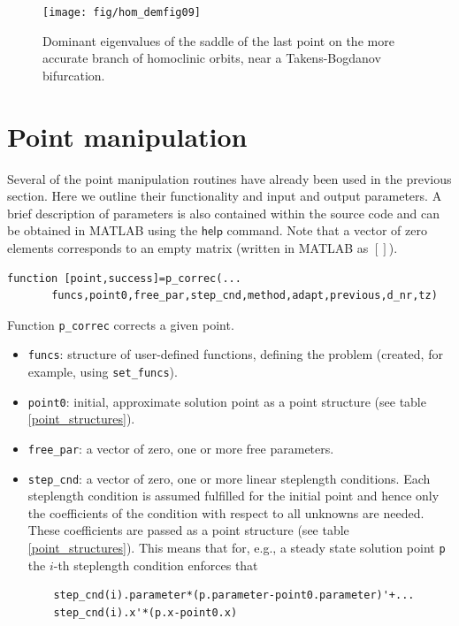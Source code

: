 \documentclass[10pt]{scrartcl}
\newcommand{\parm}[1]{\mathsf{#1}}
\newcommand{\blist}[1]{\mbox{\lstinline!#1!}}
\begin{document}
{\begin{figure}
  \begin{center}
    \texttt{[image: fig/hom\_demfig09]}
    \caption{Dominant eigenvalues of the saddle of the last point on the 
      more accurate branch
      of homoclinic orbits,
      near a Takens-Bogdanov bifurcation.\label{demo3-9}}
  \end{center}
\end{figure}

\fi
\section{Point manipulation}\label{point_manipulation}

Several of the point manipulation routines have already been used in
the previous section.  Here we outline their functionality and input
and output parameters.  A brief description of parameters is also
contained within the source code and can be obtained in MATLAB using
the $\parm{help}$ command. Note that a vector of zero elements
corresponds to an empty matrix (written in MATLAB as $[]$). 
\begin{lstlisting}
function [point,success]=p_correc(...
       funcs,point0,free_par,step_cnd,method,adapt,previous,d_nr,tz)  
\end{lstlisting}
\noindent Function \blist{p_correc} corrects a given point.
\begin{itemize}
\item \blist{funcs}: structure of user-defined functions, defining the
  problem (created, for example, using \blist{set_funcs}).
\item \blist{point0}: initial, approximate solution point as a point
  structure (see table \ref{point_structures}).
\item \blist{free_par}: a vector of zero, one or more free parameters.
\item \blist{step_cnd}: a vector of zero, one or more linear
  steplength conditions. Each steplength condition is assumed
  fulfilled for the initial point and hence only the coefficients of
  the condition with respect to all unknowns are needed. These
  coefficients are passed as a point structure (see table
  \ref{point_structures}).  This means that for, e.g., a steady state
  solution point \blist{p} the $i$-th steplength condition enforces that
  \begin{lstlisting}
    step_cnd(i).parameter*(p.parameter-point0.parameter)'+...
    step_cnd(i).x'*(p.x-point0.x)
  \end{lstlisting}

\end{itemize}}
\end{document}
